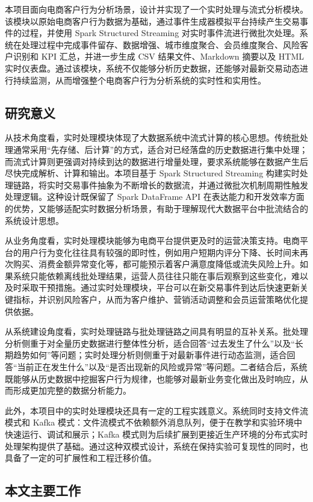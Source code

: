 \documentclass[12pt,hyperref,a4paper,UTF8]{ctexart}
\begin{document}
本项目面向电商客户行为分析场景，设计并实现了一个实时处理与流式分析模块。该模块以原始电商客户行为数据为基础，通过事件生成器模拟平台持续产生交易事件的过程，并使用 Spark Structured Streaming 对实时事件流进行微批次处理。系统在处理过程中完成事件留存、数据增强、城市维度聚合、会员维度聚合、风险客户识别和 KPI 汇总，并进一步生成 CSV 结果文件、Markdown 摘要以及 HTML 实时仪表盘。通过该模块，系统不仅能够分析历史数据，还能够对最新交易动态进行持续监测，从而增强整个电商客户行为分析系统的实时性和实用性。

\subsection{研究意义}

从技术角度看，实时处理模块体现了大数据系统中流式计算的核心思想。传统批处理通常采用“先存储、后计算”的方式，适合对已经落盘的历史数据进行集中处理；而流式计算则更强调对持续到达的数据进行增量处理，要求系统能够在数据产生后尽快完成解析、计算和输出。本项目基于 Spark Structured Streaming 构建实时处理链路，将实时交易事件抽象为不断增长的数据流，并通过微批次机制周期性触发处理逻辑。这种设计既保留了 Spark DataFrame API 在表达能力和开发效率方面的优势，又能够适配实时数据分析场景，有助于理解现代大数据平台中批流结合的系统设计思想。

从业务角度看，实时处理模块能够为电商平台提供更及时的运营决策支持。电商平台的用户行为变化往往具有较强的即时性，例如用户短期内评分下降、长时间未再次购买、消费金额异常变化等，都可能预示着客户满意度降低或流失风险上升。如果系统只能依赖离线批处理结果，运营人员往往只能在事后观察到这些变化，难以及时采取干预措施。通过实时处理模块，平台可以在新交易事件到达后快速更新关键指标，并识别风险客户，从而为客户维护、营销活动调整和会员运营策略优化提供依据。

从系统建设角度看，实时处理链路与批处理链路之间具有明显的互补关系。批处理分析侧重于对全量历史数据进行整体性分析，适合回答“过去发生了什么”以及“长期趋势如何”等问题；实时处理分析则侧重于对最新事件进行动态监测，适合回答“当前正在发生什么”以及“是否出现新的风险或异常”等问题。二者结合后，系统既能够从历史数据中挖掘客户行为规律，也能够对最新业务变化做出及时响应，从而形成更加完整的数据分析能力。

此外，本项目中的实时处理模块还具有一定的工程实践意义。系统同时支持文件流模式和 Kafka 模式：文件流模式不依赖额外消息队列，便于在教学和实验环境中快速运行、调试和展示；Kafka 模式则为后续扩展到更接近生产环境的分布式实时处理架构提供了基础。通过这种双模式设计，系统在保持实验可复现性的同时，也具备了一定的可扩展性和工程迁移价值。

\subsection{本文主要工作}
\end{document}
